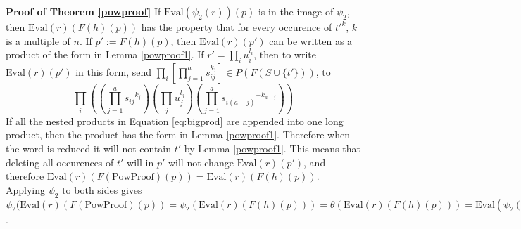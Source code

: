 \documentclass[11pt]{article} %
\theoremstyle{definition}
\theoremstyle{definition}
\theoremstyle{definition}
\theoremstyle{definition}
\theoremstyle{definition}
\theoremstyle{definition}
\begin{document}
\textbf{Proof of Theorem \ref{powproof}} \newline
If $\text{Eval}(\psi_2(r))(p)$ is in the image of $\psi_2$, then
$\text{Eval}(r)(F(h)(p))$ has the property
that for every occurence of $t'^k$, $k$ is a multiple of $n$.
If $p' := F(h)(p)$,
then $\text{Eval}(r)(p')$ can be written as a product of the form in
Lemma \ref{powproof1}.
If $r' = \prod_i u_i^{l_i}$, then to write $\text{Eval}(r)(p')$ in this
form, send $\prod_i \left[\prod_{j = 1}^a s_{ij}^{k_j}\right]
\in P(F(S \cup \{t'\}))$, to
\begin{equation} \label{eq:bigprod}
  \prod_i \left(\left(\prod_{j = 1}^a {s_{ij}}^{k_j}\right) \left(\prod_j u_j^{l_j}\right)
  \left(\prod_{j = 1}^a {s_{i(a - j)}}^{-k_{a - j}}\right)\right)
\end{equation}
If all the nested products in Equation \ref{eq:bigprod} are appended into one long product,
then the product has the form in Lemma \ref{powproof1}. Therefore when the word is reduced
it will not contain $t'$ by Lemma \ref{powproof1}. This means that deleting all occurences of
$t'$ will in $p'$ will not change $\text{Eval}(r)(p')$, and therefore
$\text{Eval}(r)(F(\text{PowProof})(p)) = \text{Eval}(r)(F(h)(p))$.
Applying $\psi_2$ to both sides gives
$\psi_2(\text{Eval}(r)(F(\text{PowProof})(p)) =
  \psi_2(\text{Eval}(r)(F(h)(p))) =
  \theta(\text{Eval}(r)(F(h)(p))) =
  \text{Eval}(\psi_2(r))(p)$.
\end{document}
